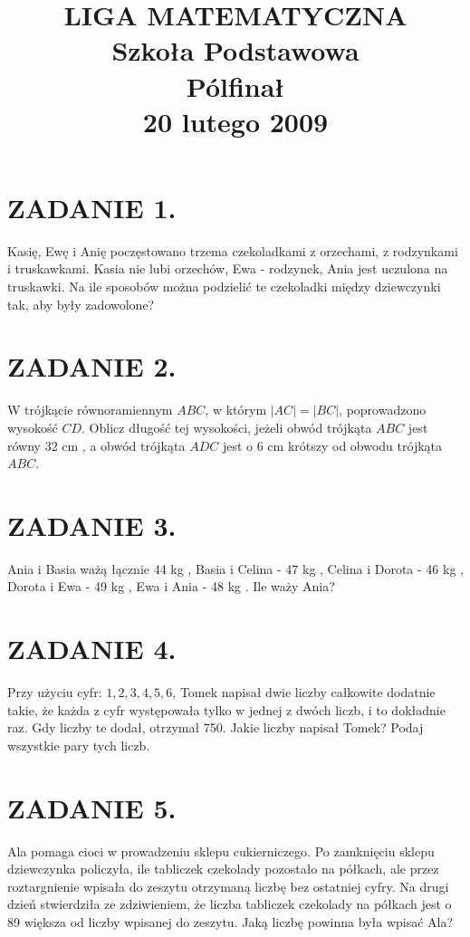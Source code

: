 \documentclass[10pt]{article}
\title{LIGA MATEMATYCZNA \\
 Szkoła Podstawowa \\
 Pólfinał \\
 20 lutego 2009 }
\author{}
\date{}
\begin{document}
\maketitle
\section*{ZADANIE 1.}
Kasię, Ewę i Anię poczęstowano trzema czekoladkami z orzechami, z rodzynkami i truskawkami. Kasia nie lubi orzechów, Ewa - rodzynek, Ania jest uczulona na truskawki. Na ile sposobów można podzielić te czekoladki między dziewczynki tak, aby były zadowolone?

\section*{ZADANIE 2.}
W trójkącie równoramiennym \(A B C\), w którym \(|A C|=|B C|\), poprowadzono wysokość \(C D\). Oblicz długość tej wysokości, jeżeli obwód trójkąta \(A B C\) jest równy 32 cm , a obwód trójkąta \(A D C\) jest o 6 cm krótszy od obwodu trójkąta \(A B C\).

\section*{ZADANIE 3.}
Ania i Basia ważą łącznie 44 kg , Basia i Celina - 47 kg , Celina i Dorota - 46 kg , Dorota i Ewa - 49 kg , Ewa i Ania - 48 kg . Ile waży Ania?

\section*{ZADANIE 4.}
Przy użyciu cyfr: \(1,2,3,4,5,6\), Tomek napisał dwie liczby całkowite dodatnie takie, że każda z cyfr występowała tylko w jednej z dwóch liczb, i to dokładnie raz. Gdy liczby te dodał, otrzymał 750. Jakie liczby napisał Tomek? Podaj wszystkie pary tych liczb.

\section*{ZADANIE 5.}
Ala pomaga cioci w prowadzeniu sklepu cukierniczego. Po zamknięciu sklepu dziewczynka policzyła, ile tabliczek czekolady pozostało na półkach, ale przez roztargnienie wpisała do zeszytu otrzymaną liczbę bez ostatniej cyfry. Na drugi dzień stwierdziła ze zdziwieniem, że liczba tabliczek czekolady na półkach jest o 89 większa od liczby wpisanej do zeszytu. Jaką liczbę powinna była wpisać Ala?
\end{document}
